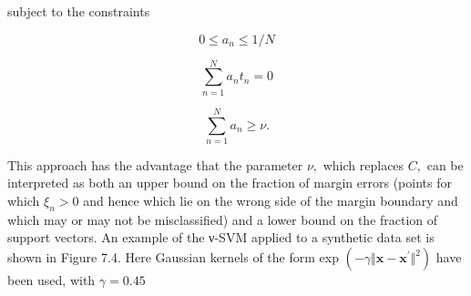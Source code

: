 \documentclass[
  10
]{article}
\begin{document}
subject to the constraints

\[
0 \leqslant a _ {n} \leqslant 1 / N\tag{7.39}
\]

\[
\sum_ {n = 1} ^ {N} a _ {n} t _ {n} = 0\tag{7.40}
\]

\[
\sum_ {n = 1} ^ {N} a _ {n} \geqslant \nu .\tag{7.41}
\]

This approach has the advantage that the parameter \(\nu ,\) which
replaces \(C ,\) can be interpreted as both an upper bound on the
fraction of margin errors (points for which \(\xi _ { n } > 0\) and
hence which lie on the wrong side of the margin boundary and which may
or may not be misclassified) and a lower bound on the fraction of
support vectors. An example of the ν-SVM applied to a synthetic data set
is shown in Figure 7.4. Here Gaussian kernels of the form exp
\(( - \gamma \Vert \mathbf { x } - \mathbf { x } ^ { \prime } \Vert ^ { 2 } )\)
have been used, with \(\gamma = 0 . 4 5\)
\end{document}
